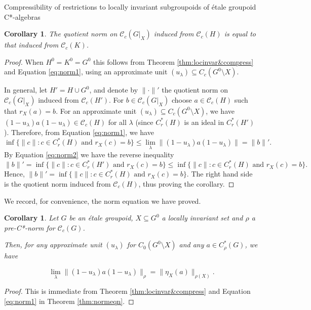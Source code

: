 \documentclass[a4paper, 12pt]{amsart}
\newtheorem{cor}[thm]{Corollary}
\theoremstyle{definition}
\theoremstyle{remark}
\numberwithin{equation}{section}
\begin{document}
\begin{section}{Compressibility of restrictions to locally invariant subgroupoids of \'etale groupoid C*-algebras}
\begin{cor}
The quotient norm on $\mathscr{C}_{c}(G|_{X})$ induced from $\mathscr{C}_{c}(H)$ is equal to that induced from $\mathscr{C}_{c}(K)$.
\end{cor}

\begin{proof}
    When $H^{0} = K^{0} = G^{0}$ this follows from Theorem \ref{thm:locinvar&compress} and Equation \ref{eq:norm1}, using an approximate unit $(u_{\lambda})\subseteq C_{c}(G^{0}\setminus X)$. 
    
    
    In general, let $H' = H\cup G^{0}$, and denote by $\|\cdot\|'$ the quotient norm on $\mathscr{C}_{c}(G|_{X})$ induced from $\mathscr{C}_{c}(H')$. For $b\in \mathscr{C}_{c}(G|_{X})$ choose $a\in \mathscr{C}_{c}(H)$ such that $r_{X}(a) = b$. For an approximate unit $(u_{\lambda})\subseteq C_{c}(G^{0}\setminus X)$, we have $(1-u_{\lambda})a(1-u_{\lambda})\in \mathscr{C}_{c}(H)$ for all $\lambda$ (since $C^{*}_{r}(H)$ is an ideal in $C^{*}_{r}(H')$). Therefore, from Equation \ref{eq:norm1}, we have $$\inf\{\|c\|: c\in C^{*}_{r}(H)\text{ and } r_{X}(c) = b\}\leq \lim_{\lambda}\|(1-u_{\lambda})a(1-u_{\lambda})\| = \|b\|'.$$ By Equation \ref{eq:norm2} we have the reverse inequality $$\|b\|' = \inf\{\|c\|: c\in C^{*}_{r}(H')\text{ and } r_{X}(c) = b\}\leq \inf\{\|c\|: c\in C^{*}_{r}(H)\text{ and } r_{X}(c) = b\}.$$ Hence, $\|b\|' = \inf\{\|c\|: c\in C^{*}_{r}(H)\text{ and } r_{X}(c) = b\}$. The right hand side is the quotient norm induced from $\mathscr{C}_{c}(H)$, thus proving the corollary.
\end{proof}

We record, for convenience, the norm equation we have proved.

\begin{cor}
\label{cor:normeqngpd}
       Let $G$ be an \'etale groupoid, $X\subseteq G^{0}$ a locally invariant set and $\rho$ a pre-C*-norm for $\mathscr{C}_{c}(G)$.
       
       Then, for any approximate unit $(u_{\lambda})$ for $C_{0}(G^{0}\setminus X)$ and any $a\in C^{*}_{\rho}(G)$, we have 
       
       \begin{equation}
       \label{eq:norm3}
           \lim_{\lambda}\|(1-u_{\lambda})a(1-u_{\lambda})\|_{\rho} = \|\eta_{X}(a)\|_{\rho(X)}.
       \end{equation}
\end{cor}

\begin{proof}
    This is immediate from Theorem \ref{thm:locinvar&compress} and Equation \ref{eq:norm1} in Theorem \ref{thm:normeqn}.
\end{proof}


\end{section}
\end{document}
